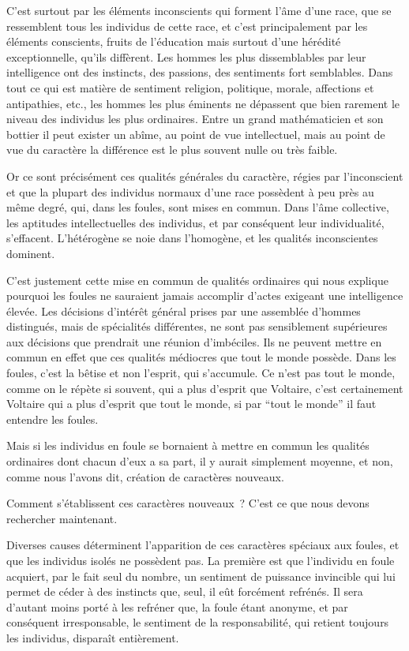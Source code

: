 \documentclass[french,twoside]{book} %
\begin{document}
C’est surtout par les éléments inconscients qui forment l’âme d’une race, que se ressemblent tous les individus de cette race, et c’est principalement par les éléments conscients, fruits de l’éducation mais surtout d’une hérédité exceptionnelle, qu’ils diffèrent. Les hommes les plus dissemblables par leur intelligence ont des instincts, des passions, des sentiments fort semblables. Dans tout ce qui est matière de senti­ment religion, politique, morale, affections et antipathies, etc., les hommes les plus éminents ne dépassent que bien rarement le niveau des individus les plus ordinaires. Entre un grand mathématicien et son bottier il peut exister un abîme, au point de vue intellectuel, mais au point de vue du caractère la différence est le plus sou­vent nulle ou très faible.\par
Or ce sont précisément ces qualités générales du caractère, régies par l’inconscient et que la plupart des individus normaux d’une race possèdent à peu près au même degré, qui, dans les foules, sont mises en commun. Dans l’âme collective, les aptitu­des intellectuelles des individus, et par conséquent leur individualité, s’effacent. L’hétérogène se noie dans l’homogène, et les qualités inconscientes dominent.\par
C’est justement cette mise en commun de qualités ordinaires qui nous explique pourquoi les foules ne sauraient jamais accomplir d’actes exigeant une intelligence élevée. Les décisions d’intérêt général prises par une assemblée d’hommes distingués, mais de spécialités différentes, ne sont pas sensiblement supérieures aux décisions que prendrait une réunion d’imbéciles. Ils ne peuvent mettre en commun en effet que ces qualités médiocres que tout le monde possède. Dans les foules, c’est la bêtise et non l’esprit, qui s’accumule. Ce n’est pas tout le monde, comme on le répète si souvent, qui a plus d’esprit que Voltaire, c’est certainement Voltaire qui a plus d’esprit que tout le monde, si par “tout le monde” il faut entendre les foules.\par
Mais si les individus en foule se bornaient à mettre en commun les qualités ordinaires dont chacun d’eux a sa part, il y aurait simplement moyenne, et non, com­me nous l’avons dit, création de caractères nouveaux.\par
Comment s’établissent ces caractères nouveaux ? C’est ce que nous devons rechercher maintenant.\par
Diverses causes déterminent l’apparition de ces caractères spéciaux aux foules, et que les individus isolés ne possèdent pas. La première est que l’individu en foule acquiert, par le fait seul du nombre, un sentiment de puissance invincible qui lui per­met de céder à des instincts que, seul, il eût forcément refrénés. Il sera d’autant moins porté à les refréner que, la foule étant anonyme, et par conséquent irresponsable, le sentiment de la responsabilité, qui retient toujours les individus, disparaît entièrement.\par
\end{document}
